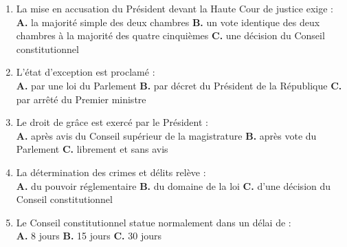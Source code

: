 \documentclass[11pt,a4paper,oneside]{report}
\begin{document}
\begin{enumerate}[label=\textbf{Q\arabic*.},leftmargin=2.4em]
  \textbf{A.} le Congrès \quad \textbf{B.} le Conseil des ministres \quad \textbf{C.} la Haute Cour de justice
  \item La mise en accusation du Président devant la Haute Cour de justice exige :\\
  \textbf{A.} la majorité simple des deux chambres \quad \textbf{B.} un vote identique des deux chambres à la majorité des quatre cinquièmes \quad \textbf{C.} une décision du Conseil constitutionnel
  \item L'état d'exception est proclamé :\\
  \textbf{A.} par une loi du Parlement \quad \textbf{B.} par décret du Président de la République \quad \textbf{C.} par arrêté du Premier ministre
  \item Le droit de grâce est exercé par le Président :\\
  \textbf{A.} après avis du Conseil supérieur de la magistrature \quad \textbf{B.} après vote du Parlement \quad \textbf{C.} librement et sans avis
  \item La détermination des crimes et délits relève :\\
  \textbf{A.} du pouvoir réglementaire \quad \textbf{B.} du domaine de la loi \quad \textbf{C.} d'une décision du Conseil constitutionnel
  \item Le Conseil constitutionnel statue normalement dans un délai de :\\
  \textbf{A.} 8 jours \quad \textbf{B.} 15 jours \quad \textbf{C.} 30 jours
\end{enumerate}
\end{document}
